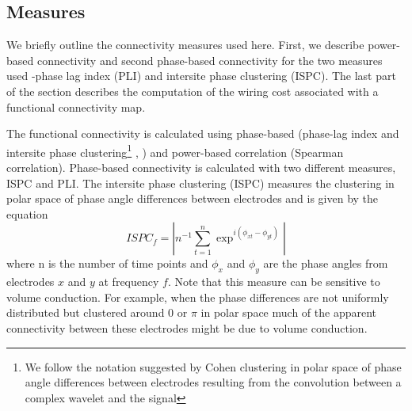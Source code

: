 \documentclass[11pt, onecolumn]{article}
\begin{document}
\subsection{Measures}
We briefly outline the connectivity measures used here. First, we describe power-based connectivity and second phase-based connectivity for the two measures used -phase lag index (PLI) and intersite phase clustering (ISPC). The last part of the section describes the computation of the wiring cost associated with a functional connectivity map. %

The functional connectivity is calculated using phase-based (phase-lag index \citep{stam2007phase} and intersite phase clustering\footnote{We follow the notation suggested by Cohen \citep{cohen2014analyzing} clustering in polar space of phase angle differences between electrodes resulting from the convolution between a complex wavelet and the signal} \citep{lachaux1999measuring}, \citep{mormann2000mean}) and power-based correlation (Spearman correlation). 
Phase-based connectivity is calculated with two different measures, ISPC and PLI. The intersite phase clustering (ISPC) measures the clustering in polar space of phase angle differences between electrodes and is given by the equation 
\begin{equation}
ISPC_f = | n^{-1} \sum_{t=1}^{n} \exp ^{i(\phi_{xt} -\phi_{yt})}|
\label{eq:ispc}
\end{equation}
where n is the number of time points and $\phi_x$ and $\phi_y$ are the phase angles from electrodes $x$ and $y$ at frequency $f$. Note that this measure can be sensitive to volume conduction. For example, when the phase differences are not uniformly distributed but clustered around 0 or $\pi$ in polar space much of the apparent connectivity between these electrodes might be due to volume conduction.

\end{document}
